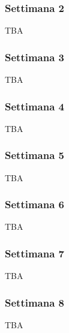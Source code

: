 \subsubsection{Settimana 2}
TBA
\subsubsection{Settimana 3}
TBA
\subsubsection{Settimana 4}
TBA
\subsubsection{Settimana 5}
TBA
\subsubsection{Settimana 6}
TBA
\subsubsection{Settimana 7}
TBA
\subsubsection{Settimana 8}
TBA